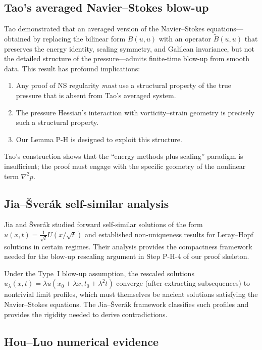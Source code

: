 \documentclass[11pt]{article}
\theoremstyle{definition}
\theoremstyle{remark}
\begin{document}
\subsection{Tao's averaged Navier--Stokes blow-up}

Tao \cite{Tao} demonstrated that an averaged version of the Navier--Stokes
equations---obtained by replacing the bilinear form $B(u,u)$ with an operator
$\tilde{B}(u,u)$ that preserves the energy identity, scaling symmetry, and
Galilean invariance, but not the detailed structure of the pressure---admits
finite-time blow-up from smooth data.  This result has profound implications:

\begin{enumerate}[nosep]
  \item Any proof of NS regularity \emph{must} use a structural property of the
    true pressure that is absent from Tao's averaged system.
  \item The pressure Hessian's interaction with vorticity--strain geometry is
    precisely such a structural property.
  \item Our Lemma P-H is designed to exploit this structure.
\end{enumerate}

Tao's construction shows that the ``energy methods plus scaling'' paradigm is
insufficient; the proof must engage with the specific geometry of the nonlinear
term $\nabla^2 p$.

\subsection{Jia--\v{S}ver\'ak self-similar analysis}

Jia and \v{S}ver\'ak \cite{JS} studied forward self-similar solutions of the form
$u(x,t) = \frac{1}{\sqrt{t}} U(x/\sqrt{t})$ and established non-uniqueness results
for Leray--Hopf solutions in certain regimes.  Their analysis provides the
compactness framework needed for the blow-up rescaling argument in Step P-H-4 of
our proof skeleton.

Under the Type~I blow-up assumption, the rescaled solutions
$u_\lambda(x,t) = \lambda u(x_0 + \lambda x, t_0 + \lambda^2 t)$ converge
(after extracting subsequences) to nontrivial limit profiles, which must themselves
be ancient solutions satisfying the Navier--Stokes equations.  The Jia--\v{S}ver\'ak
framework classifies such profiles and provides the rigidity needed to derive
contradictions.

\subsection{Hou--Luo numerical evidence}
\end{document}
